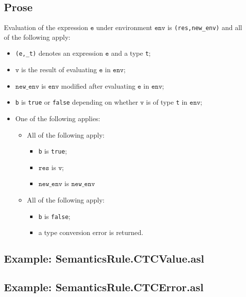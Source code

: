 \documentclass{book}
\newcommand\newenv[0]{\texttt{new\_env}}
\newcommand\env[0]{\texttt{env}}
\newcommand\ve[0]{\texttt{e}}
\newcommand\vv[0]{\texttt{v}}
\newcommand\vres[0]{\texttt{res}}
\begin{document}
  \subsection{Prose}
  Evaluation of the expression $\ve$ under environment $\env$ is
  \texttt{(res,new\_env)} and all of the following apply:
  \begin{itemize}
  \item \texttt{(e,\_t)} denotes an expression $\ve$ and a type \texttt{t};
  \item $\vv$ is the result of evaluating $\ve$ in $\env$;
  \item $\newenv$ is $\env$ modified after evaluating $\ve$ in $\env$;
  \item \texttt{b} is \texttt{true} or \texttt{false} depending on whether $\vv$ is of type \texttt{t} in $\env$;
  \item One of the following applies:
        \begin{itemize}
        \item All of the following apply:
              \begin{itemize}
              \item \texttt{b} is \texttt{true};
              \item $\vres$ is $\vv$;
              \item $\newenv$ is $\newenv$
              \end{itemize}
        \item All of the following apply:
              \begin{itemize}
              \item \texttt{b} is \texttt{false};
              \item a type conversion error is returned.
              \end{itemize}
        \end{itemize}
  \end{itemize}

  \subsection{Example: SemanticsRule.CTCValue.asl}

  \subsection{Example: SemanticsRule.CTCError.asl}
\end{document}
